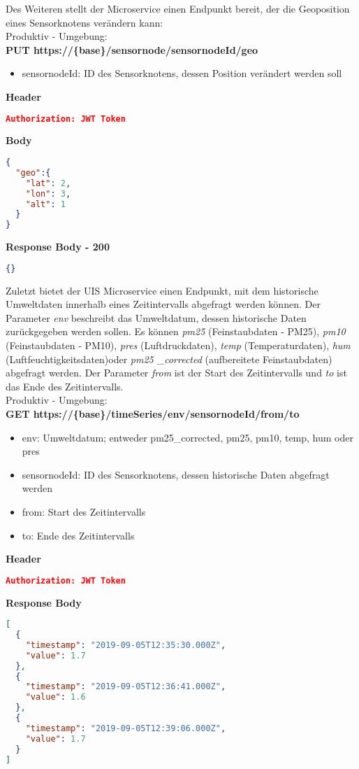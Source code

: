 Des Weiteren stellt der Microservice einen Endpunkt bereit, der die Geoposition eines Sensorknotens verändern kann:
\\
Produktiv - Umgebung:
\\
\textbf{PUT https://\{base\}/sensornode/sensornodeId/geo}
\begin{itemize}
	\item sensornodeId: ID des Sensorknotens, dessen Position verändert werden soll
\end{itemize}
\textbf{Header}
\begin{lstlisting}[language=json,firstnumber=1,basicstyle=\footnotesize]
Authorization: JWT Token
\end{lstlisting}
\textbf{Body}
\begin{lstlisting}[language=json,firstnumber=1,basicstyle=\footnotesize]
{
  "geo":{
    "lat": 2,
    "lon": 3,
    "alt": 1
  }
}
\end{lstlisting}

\textbf{Response Body - 200}
\begin{lstlisting}[language=json,firstnumber=1,basicstyle=\footnotesize]
{}
\end{lstlisting}

Zuletzt bietet der UIS Microservice einen Endpunkt, mit dem historische Umweltdaten innerhalb eines Zeitintervalls abgefragt werden können.
Der Parameter \textit{env} beschreibt das Umweltdatum, dessen historische Daten zurückgegeben werden sollen.
Es können \textit{pm25} (Feinstaubdaten - PM25), \textit{pm10} (Feinstaubdaten - PM10), \textit{pres} (Luftdruckdaten), \textit{temp} (Temperaturdaten), \textit{hum} (Luftfeuchtigkeitsdaten)oder \textit{pm25 \_corrected} (aufbereitete Feinstaubdaten) abgefragt werden.
Der Parameter \textit{from} ist der Start des Zeitintervalls und \textit{to} ist das Ende des Zeitintervalls. 
\\
Produktiv - Umgebung:
\\
\textbf{GET https://\{base\}/timeSeries/env/sensornodeId/from/to}
\begin{itemize}
	\item env: Umweltdatum; entweder pm25\_corrected, pm25, pm10, temp, hum oder pres 
	\item sensornodeId: ID des Sensorknotens, dessen historische Daten abgefragt werden
	\item from: Start des Zeitintervalls
	\item to: Ende des Zeitintervalls
\end{itemize}
\textbf{Header}
\begin{lstlisting}[language=json,firstnumber=1,basicstyle=\footnotesize]
Authorization: JWT Token
\end{lstlisting}
\textbf{Response Body}
\begin{lstlisting}[language=json,firstnumber=1,basicstyle=\footnotesize]
[
  {
    "timestamp": "2019-09-05T12:35:30.000Z",
    "value": 1.7
  },
  {
    "timestamp": "2019-09-05T12:36:41.000Z",
    "value": 1.6
  },
  {
    "timestamp": "2019-09-05T12:39:06.000Z",
    "value": 1.7
  }
]
\end{lstlisting}

